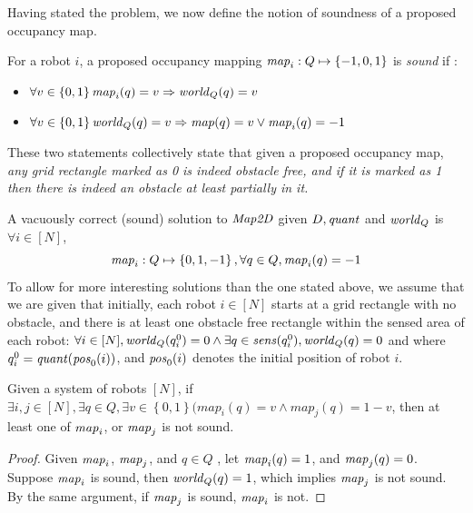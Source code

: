 
Having stated the problem, we now define the notion of soundness of a proposed occupancy map.
\begin{definition}
    \label{soundness}
    For a robot $i$, a proposed occupancy mapping $\mathit{map}_i: Q \mapsto \left\{-1,0,1\right\}$ is \emph{sound} if :
    \begin{itemize}
        \item $\forall v \in \left\{0,1\right\} \mathit{map}_i(q) = v \Rightarrow \mathit{world}_Q(q)  = v$
        \item $\forall v \in \left\{0,1\right\}\mathit{world}_Q(q) = v \Rightarrow \mathit{map}(q) = v \vee \mathit{map}_i(q) = -1$
    \end{itemize}
\end{definition}


These two statements collectively state that given a proposed occupancy map, \emph{any grid rectangle marked as 0 is indeed obstacle free, and if it is marked as 1 then there is indeed an obstacle at least partially in it.}

A vacuously correct (sound) solution to $\mathit{Map2D}$ given $D, \mathit{quant}$ and $\mathit{world}_Q$ is $\forall i \in [N]$, $$\mathit{map}_i : Q \mapsto \left\{0,1,-1\right\}, \forall  q \in Q , \mathit{map}_i(q)= -1$$ To allow for more interesting solutions than the one stated above, we assume that we are given that initially, each robot $i\in[N]$ starts at a grid rectangle with no obstacle, and there is at least one obstacle free rectangle within the sensed area of each robot:
$\forall i \in [N], \mathit{world}_Q(q^0_i) = 0 \wedge \exists q \in \mathit{sens}(q^0_i), \mathit{world}_Q(q) = 0 $ and
where $q^0_i = \mathit{quant}(\mathit{pos}_0(i))$, and $\mathit{pos}_0(i)$ denotes the initial position of robot $i$.




\begin{lemma}
    \label{comptbl}
    Given a system of robots $[N]$, if $\exists i , j \in [N], \exists  q \in Q, \exists v \in \left\{0,1\right\} (map_i(q) = v \wedge
    map_j(q) = 1 - v $, then at least one of $\mathit{map}_i$, or $\mathit{map}_j$ is not sound.
\end{lemma}

\begin{proof}
    Given $\mathit{map}_i$, $\mathit{map}_j$, and $q\in Q$ , let $\mathit{map}_i(q) = 1$, and $\mathit{map}_j(q) = 0$. Suppose $\mathit{map}_i$ is sound, then $\mathit{world}_Q(q) = 1$, which implies $\mathit{map}_j$ is not sound. By the same argument, if $\mathit{map}_j$ is sound, $\mathit{map}_i$ is not.
\end{proof}

